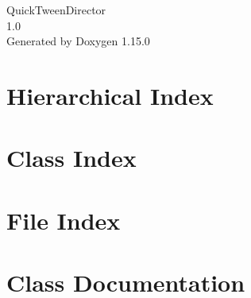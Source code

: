 \documentclass[twoside]{book}
\newcommand{\+}{\discretionary{\mbox{\scriptsize$\hookleftarrow$}}{}{}}
\newcommand{\clearemptydoublepage}{%
    \newpage{\pagestyle{empty}\cleardoublepage}%
  }
\begin{document}
  \raggedbottom
    \hypersetup{pageanchor=false,
                bookmarksnumbered=true,
                pdfencoding=unicode
               }
  \begin{titlepage}
  \vspace*{7cm}
  \begin{center}%
  {\Large Quick\+Tween\+Director}\\
  [1ex]\large 1.\+0 \\
  \vspace*{1cm}
  {\large Generated by Doxygen 1.15.0}\\
  \end{center}
  \end{titlepage}
  \clearemptydoublepage
  \tableofcontents
  \clearemptydoublepage
  \hypersetup{pageanchor=true}

\chapter{Hierarchical Index}

\chapter{Class Index}

\chapter{File Index}

\chapter{Class Documentation}






















\end{document}
